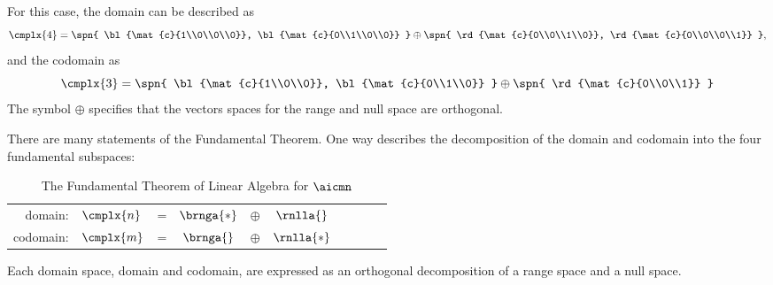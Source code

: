 For this case, the domain can be described as
  \begin{equation*}   %
      \cmplx{4} = \spn{ \bl{\mat{c}{1\\0\\0\\0}}, \bl{\mat{c}{0\\1\\0\\0}} } \oplus \spn{ \rd{\mat{c}{0\\0\\1\\0}}, \rd{\mat{c}{0\\0\\0\\1}} },
  \end{equation*}
and the codomain as
  \begin{equation*}   %
      \cmplx{3} = \spn{ \bl{\mat{c}{1\\0\\0}}, \bl{\mat{c}{0\\1\\0}} } \oplus \spn{ \rd{\mat{c}{0\\0\\1}} }
  \end{equation*}
The symbol $\oplus$ specifies that the vectors spaces for the range and null space are orthogonal.

There are many statements of the Fundamental Theorem. One way describes the decomposition of the domain and codomain into the four fundamental subspaces:
\begin{table}[htbp]  %
    \caption[The Fundamental Theorem of Linear Algebra]{The Fundamental Theorem of Linear Algebra for $\aicmn$ }
    \begin{center}
    		\begin{tabular}{rlcccccccc}
    		  domain:   & $\cmplx{n}$ & = & $\brnga{*}$ & $\oplus$ & $\rnlla{}$ \\
    		  codomain: & $\cmplx{m}$ & = & $\brnga{}$  & $\oplus$ & $\rnlla{*}$
      \end{tabular}
    \end{center}
  \label{tab:ftola}
  \end{table}%
Each domain space, domain and codomain, are expressed as an orthogonal decomposition of a range space and a null space.

